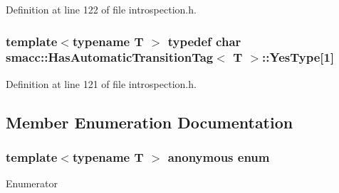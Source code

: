 Definition at line 122 of file introspection.\+h.

\subsubsection[{\texorpdfstring{Yes\+Type}{YesType}}]{\setlength{\rightskip}{0pt plus 5cm}template$<$typename T $>$ typedef char {\bf smacc\+::\+Has\+Automatic\+Transition\+Tag}$<$ T $>$\+::Yes\+Type\mbox{[}1\mbox{]}\hspace{0.3cm}{\ttfamily [private]}}\hypertarget{classsmacc_1_1HasAutomaticTransitionTag_ad3b0dca13c15ca18d97bbfa0f613614c}{}\label{classsmacc_1_1HasAutomaticTransitionTag_ad3b0dca13c15ca18d97bbfa0f613614c}


Definition at line 121 of file introspection.\+h.



\subsection{Member Enumeration Documentation}
\subsubsection[{\texorpdfstring{anonymous enum}{anonymous enum}}]{\setlength{\rightskip}{0pt plus 5cm}template$<$typename T $>$ anonymous enum}\hypertarget{classsmacc_1_1HasAutomaticTransitionTag_a129d2cfdc3c2071feb6eed2f328e77de}{}\label{classsmacc_1_1HasAutomaticTransitionTag_a129d2cfdc3c2071feb6eed2f328e77de}
\begin{Desc}
\item[Enumerator]\par
\begin{description}
\item[{\em 
value\hypertarget{classsmacc_1_1HasAutomaticTransitionTag_a129d2cfdc3c2071feb6eed2f328e77deac3cf7791b7f6bf4d5f4c7a93de7624a8}{}\label{classsmacc_1_1HasAutomaticTransitionTag_a129d2cfdc3c2071feb6eed2f328e77deac3cf7791b7f6bf4d5f4c7a93de7624a8}
}]\end{description}
\end{Desc}


